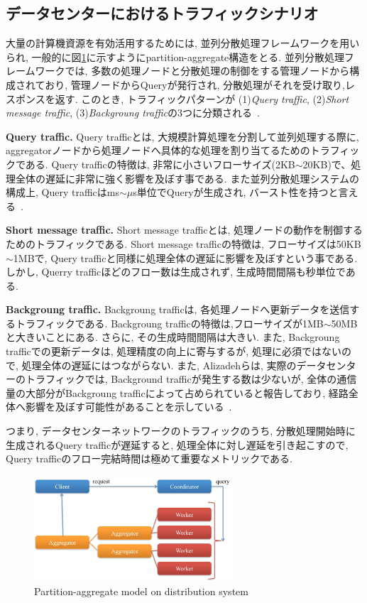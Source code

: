 \documentclass[10pt, a4paper, twocolumn]{jsarticle}
\begin{document}
\subsection{データセンターにおけるトラフィックシナリオ}
\label{sec:traffic_scenario}
大量の計算機資源を有効活用するためには,
並列分散処理フレームワークを用いられ, 一般的に図\ref{fig:part_aggr}に示すようにpartition-aggregate構造をとる.
並列分散処理フレームワークでは, 多数の処理ノードと分散処理の制御をする管理ノードから構成されており, 管理ノードからQueryが発行され,
分散処理がそれを受け取り,レスポンスを返す.
このとき, トラフィックパターンが  (1){\it Query traffic}, (2){\it Short message
traffic}, (3){\it Backgroung traffic}の3つに分類される~\cite{dctcp}.

{\bf Query traffic. }Query trafficとは, 大規模計算処理を分割して並列処理する際に,
aggregatorノードから処理ノードへ具体的な処理を割り当てるためのトラフィックである.
Query trafficの特徴は, 非常に小さいフローサイズ(2KB$\sim$20KB)で、処理全体の遅延に非常に強く影響を及ぼす事である.
また並列分散処理システムの構成上, Query trafficはms$\sim \mu$s単位でQueryが生成され,
バースト性を持つと言える~\cite{dctcp}.

{\bf Short message traffic. } Short message trafficとは,
処理ノードの動作を制御するためのトラフィックである.
Short message trafficの特徴は, フローサイズは50KB$\sim$1MBで, Query
trafficと同様に処理全体の遅延に影響を及ぼすという事である.
しかし, Querry trafficほどのフロー数は生成されず, 生成時間間隔も秒単位である.

{\bf Backgroung traffic. }Backgroung trafficは,
各処理ノードへ更新データを送信するトラフィックである.
Backgroung trafficの特徴は,フローサイズが1MB$\sim$50MBと大きいことにある.
さらに, その生成時間間隔は大きい.
また, Backgroung trafficでの更新データは, 処理精度の向上に寄与するが, 処理に必須ではないので,
処理全体の遅延にはつながらない.
また, Alizadehらは, 実際のデータセンターのトラフィックでは, Background trafficが発生する数は少ないが,
全体の通信量の大部分がBackgroung trafficによって占められていると報告しており,
経路全体へ影響を及ぼす可能性があることを示している~\cite{traffic}.

つまり, データセンターネットワークのトラフィックのうち, 分散処理開始時に生成されるQuery trafficが遅延すると,
処理全体に対し遅延を引き起こすので, Query trafficのフロー完結時間は極めて重要なメトリックである.

\begin{figure}[h]
    \begin{center}
    \includegraphics[autoebb, width=210pt]{./img/part_aggr.pdf}
    \caption{Partition-aggregate model on distribution system}
    \label{fig:part_aggr}
    \end{center}
\end{figure}
\end{document}
